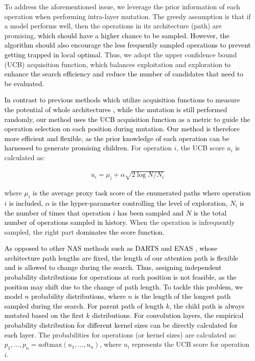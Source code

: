 \documentclass[letterpaper]{article} \usepackage{aaai22}  \usepackage{times}  \usepackage{helvet}  \usepackage{courier}  \usepackage[hyphens]{url}  \usepackage{graphicx} \urlstyle{rm} \def\UrlFont{\rm}  \usepackage{natbib}  \usepackage{caption} \DeclareCaptionStyle{ruled}{labelfont=normalfont,labelsep=colon,strut=off} \frenchspacing  \setlength{\pdfpagewidth}{8.5in}  \setlength{\pdfpageheight}{11in}  \usepackage{algorithm}
\newcommand{\prj}[1]{\textcolor{black}{#1}} \newcommand{\prjj}[1]{\textcolor{black}{#1}} \newcommand{\jhh}[1]{\textcolor{black}{#1}} \newcommand{\jh}[1]{\textcolor{black}{#1}} \newcommand{\sh}[1]{\textcolor{black}{#1}} \usepackage{multirow}
\begin{document}
To address the aforementioned issue, we leverage the prior information of each operation when performing intra-layer mutation.
The greedy assumption is that if a model performs well, then the operations
in its architecture (path) are promising, \prj{which should have a higher chance to be sampled. However, the algorithm should also encourage the less frequently sampled operations to prevent getting trapped in local optimal.}
Thus, we adopt the upper confidence bound (UCB) \citep{auer2002finite}
acquisition function, which balances exploitation and exploration \prj{to enhance the search efficiency and reduce the number of candidates that need to be evaluated}. 

\prjj{In contrast to previous methods which utilize acquisition functions to measure the potential of whole architectures \cite{li2017hyperband, shi2020bridging}, while the mutation is still performed randomly, our method uses the UCB acquisition function as a metric to guide the operation selection on each position during mutation. Our method is therefore more efficient and flexible, as the prior knowledge of each operation can be harnessed to generate promising children.} 
For operation $i$, the UCB score $u_{i}$ is calculated as: 
\vspace{-1mm}
\begin{small}
\begin{align}
u_{i}={\mu}_{i}+\alpha\sqrt{2\log{N}/N_{i}}\label{equ:ucb}
\end{align}
\end{small}
\hspace{-1.2mm}where \sh{${\mu}_{i}$ is the average \prj{proxy task score of the enumerated paths where operation $i$ is included, }
$\alpha$ is the hyper-parameter controlling the level of exploration, $N_{i}$ is the number of times that
operation $i$ has been sampled and $N$ is the total number of operations sampled in history.} When the operation is infrequently
sampled, the right part \prj{dominates the score function.}



\prj{As opposed to other NAS methods such as DARTS  \citep{liu2018darts} and ENAS  \citep{pham2018efficient}, whose architecture path lengths are fixed, the length of our attention path is flexible and is allowed to change during the search. Thus, assigning independent probability distributions
for operations at each position is not feasible, as the position may shift due to the change of path length. To tackle this problem, we model $n$ probability distributions, where $n$ is the length of the longest path sampled during the search. For \prj{parent} path of length $k$, the \prj{child} path is always mutated based on the first $k$ distributions.}
\prj{For convolution layers, the empirical probability distribution for different kernel sizes can be directly calculated for each layer.}
The probabilities for operations (or kernel sizes)
are calculated as: $p_{1},\dots,p_{n}=\text{softmax}(u_{1},\dots,u_{n})$,
where $u_{i}$ represents the UCB score for operation $i$.
\end{document}
